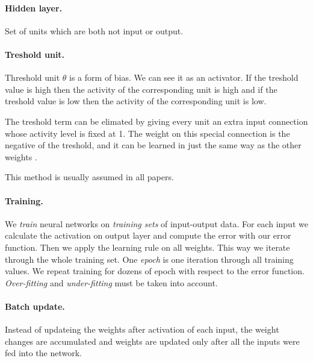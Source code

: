 \paragraph{Hidden layer.}
Set of units which are both not input or output. 

\paragraph{Treshold unit.}
Threshold unit $\theta$ is a form of bias. We can see it as an activator. If the treshold value is high then the activity of the corresponding unit is high and if the treshold value is low then the activity of the corresponding unit is low. 

The treshold term can be elimated by giving every unit an extra input connection whose activity level is fixed at 1. The weight on this special connection is the negative of the treshold, and it can be learned in just the same way as the other weights  \cite{hinton1988learning}.

This method is usually assumed in all papers. 

\paragraph{Training.}
We \emph{train} neural networks on \emph{training sets} of input-output data. For each input we calculate the activation on output layer and compute the error with our error function. Then we apply the learning rule on all weights. This way we iterate through the whole training set. One \emph{epoch} is one iteration through all training values. We repeat training for dozens of epoch with respect to the error function. \emph{Over-fitting} and \emph{under-fitting} must be taken into account.   

\paragraph{Batch update.}
Instead of updateing the weights after activation of each input, the weight changes are accumulated and weights are updated only after all the inputs were fed into the network. 
